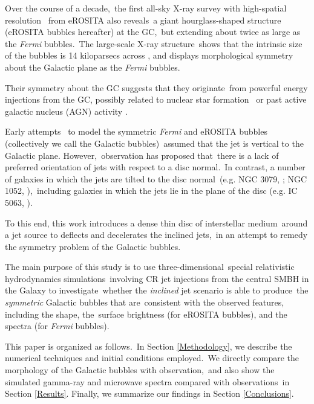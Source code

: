 \documentclass[twocolumn]{aastex631}
\begin{document}
Over the course of a decade,\
the first all-sky X-ray survey with high-spatial resolution \citep{Predehl2021}\
from eROSITA \citep{Predehl2020} also reveals\
a giant hourglass-shaped structure (eROSITA bubbles hereafter) at the GC,\
but extending about twice as large as the \textit{Fermi} bubbles.\
The large-scale X-ray structure\
shows that the intrinsic size of the bubbles is 14 kiloparsecs across \citep{Predehl2021},
and displays morphological symmetry about the Galactic plane as the \textit{Fermi} bubbles.

Their symmetry about the GC suggests that they originate\
from powerful energy injections from the GC, possibly related to nuclear star formation\
\citep{PhysRevLett.106.101102,Carretti2013}
or past active galactic nucleus (AGN) activity \citep{Guo2012,Yang2017}.

Early attempts \citep{Sarkar2015,Yang2017,Zhang2020}\
to model the symmetric \textit{Fermi} and eROSITA bubbles (collectively we call the Galactic bubbles)\
assumed that the jet is vertical to the Galactic plane. However,\
observation \citep{Gallimore2006} has proposed that\
there is a lack of preferred orientation of jets with respect to a disc normal.\
In contrast, a number of galaxies in which the jets are tilted to the disc normal\
(e.g. NGC 3079, \citealt{Cecil2001}; NGC 1052, \citealt{Dopita2015}),\
including galaxies in which the jets lie in the plane of the disc (e.g. IC 5063, \citealt{Morganti2015}).

To this end, this work introduces a dense thin disc of interstellar medium\
around a jet source to deflects and decelerates the inclined jets,\
in an attempt to remedy the symmetry problem of the Galactic bubbles.\

The main purpose of this study is to use three-dimensional\
special relativistic hydrodynamics simulations\
involving CR jet injections from the central SMBH in the Galaxy to investigate\
whether the \textit{inclined} jet scenario is able to produce\
the \textit{symmetric} Galactic bubbles that are\
consistent with the observed features, including the shape, the\
surface brightness (for eROSITA bubbles), and the spectra (for \textit{Fermi} bubbles).\

This paper is organized as follows.\
In Section \ref{Methodology}, we describe the numerical techniques and initial conditions employed.\
We directly compare the morphology of the Galactic bubbles with observation,\
and also show the simulated gamma-ray and microwave spectra compared with observations\
in Section \ref{Results}.
Finally, we summarize our findings in Section \ref{Conclusions}.
\end{document}
